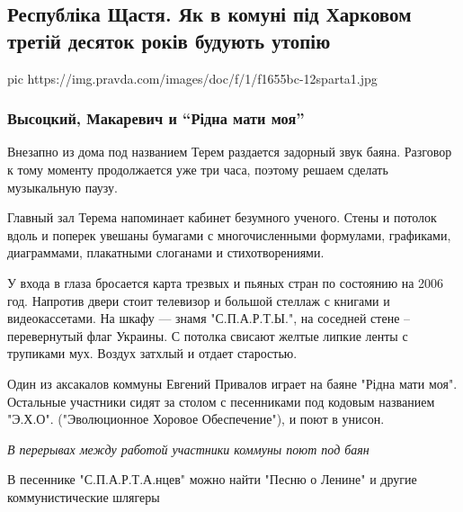  
 
\subsection{Республіка Щастя. Як в комуні під Харковом третій десяток років будують утопію}
\label{sec:25_10_2019.news.pravda_com_ua.SPARTA}

\ifcmt
pic https://img.pravda.com/images/doc/f/1/f1655bc-12sparta1.jpg
\fi




\subsubsection{Высоцкий, Макаревич и ``Рідна мати моя''}

Внезапно из дома под названием Терем раздается задорный звук баяна. Разговор к
тому моменту продолжается уже три часа, поэтому решаем сделать музыкальную
паузу.

Главный зал Терема напоминает кабинет безумного ученого. Стены и потолок вдоль
и поперек увешаны бумагами с многочисленными формулами, графиками, диаграммами,
плакатными слоганами и стихотворениями. 

У входа в глаза бросается карта трезвых и пьяных стран по состоянию на 2006
год. Напротив двери стоит телевизор и большой стеллаж с книгами и
видеокассетами. На шкафу --- знамя "С.П.А.Р.Т.Ы.", на соседней стене –
перевернутый флаг Украины. С потолка свисают желтые липкие ленты с трупиками
мух. Воздух затхлый и отдает старостью.

Один из аксакалов коммуны Евгений Привалов играет на баяне "Рідна мати моя".
Остальные участники сидят за столом с песенниками под кодовым названием
"Э.Х.О". ("Эволюционное Хоровое Обеспечение"), и поют в унисон.

{\em
В перерывах между работой участники коммуны поют под баян
\/}

В песеннике "С.П.А.Р.Т.А.нцев" можно найти "Песню о Ленине" и другие
коммунистические шлягеры

